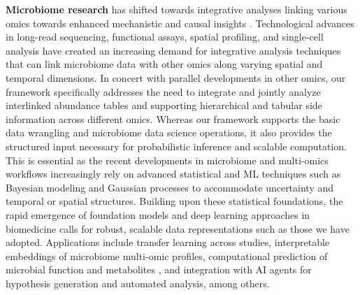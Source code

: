 \documentclass[
  sn-nature,
]{sn-jnl}
\begin{document}
\textbf{Microbiome research} has shifted towards integrative analyses
linking various omics towards enhanced mechanistic and causal insights
\citep{joos2024, bastiaanssen_bugs1_2023}. Technological advances in
long-read sequencing, functional assays, spatial profiling, and
single-cell analysis have created an increasing demand for integrative
analysis techniques that can link microbiome data with other omics along
varying spatial and temporal dimensions. In concert with parallel
developments in other omics, our framework specifically addresses the
need to integrate and jointly analyze interlinked abundance tables and
supporting hierarchical and tabular side information across different
omics. Whereas our framework supports the basic data wrangling and
microbiome data science operations, it also provides the structured
input necessary for probabilistic inference and scalable computation.
This is essential as the recent developments in microbiome and
multi-omics workflows increasingly rely on advanced statistical and ML
techniques such as Bayesian modeling and Gaussian processes to
accommodate uncertainty and temporal or spatial structures. Building
upon these statistical foundations, the rapid emergence of foundation
models and deep learning approaches in biomedicine calls for robust,
scalable data representations such as those we have adopted.
Applications include transfer learning across studies, interpretable
embeddings of microbiome multi-omic profiles, computational prediction
of microbial function and metabolites \citep{mallick2019, weiss2016},
and integration with AI agents for hypothesis generation and automated
analysis, among others.
\end{document}
